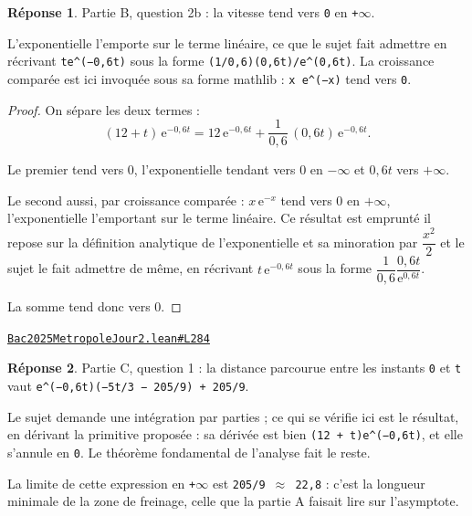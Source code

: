 \documentclass[11pt,a4paper]{article}
\theoremstyle{definition}
\theoremstyle{plain}
\theoremstyle{definition}
\newtheorem*{reponse}{Réponse}
\newcommand{\source}[2]{\par\smallskip\noindent\hfill{\footnotesize\href{#1}{\texttt{#2}}}\par\smallskip}
\begin{document}
\begin{reponse}
Partie B, question 2b : la vitesse tend vers \texttt{0} en \texttt{+\(\infty\)}.

L'exponentielle l'emporte sur le terme linéaire, ce que le sujet fait admettre en
récrivant \texttt{te\textasciicircum{}(−0,6t)} sous la forme \texttt{(1/0,6)(0,6t)/e\textasciicircum{}(0,6t)}. La croissance comparée
est ici invoquée sous sa forme mathlib : \texttt{x e\textasciicircum{}(−x)} tend vers \texttt{0}.
\end{reponse}
\begin{proof}
On sépare les deux termes :
\[ (12 + t)\,\mathrm{e}^{-0{,}6t}
   = 12\,\mathrm{e}^{-0{,}6t} + \frac{1}{0{,}6}\,(0{,}6t)\,\mathrm{e}^{-0{,}6t} . \]

Le premier tend vers $0$, l'exponentielle tendant vers $0$ en $-\infty$ et $0{,}6t$ vers
$+\infty$.

Le second aussi, par croissance comparée : $x\,\mathrm{e}^{-x}$ tend vers $0$ en
$+\infty$, l'exponentielle l'emportant sur le terme linéaire. Ce résultat est emprunté
\textemdash{} il repose sur la définition analytique de l'exponentielle et sa minoration
par $\dfrac{x^2}{2}$ \textemdash{} et le sujet le fait admettre de même, en récrivant
$t\,\mathrm{e}^{-0{,}6t}$ sous la forme $\dfrac{1}{0{,}6} \dfrac{0{,}6t}{\mathrm{e}^{0{,}6t}}$.

La somme tend donc vers $0$.
\end{proof}
\source{https://github.com/Commutator-IO/learn-lean/blob/main/exams/2025/Bac2025MetropoleJour2.lean\#L284}{Bac2025MetropoleJour2.lean\#L284}

\begin{reponse}
Partie C, question 1 : la distance parcourue entre les instants \texttt{0} et \texttt{t} vaut
\texttt{e\textasciicircum{}(−0,6t)(−5t/3 − 205/9) + 205/9}.

Le sujet demande une intégration par parties ; ce qui se vérifie ici est le résultat,
en dérivant la primitive proposée : sa dérivée est bien \texttt{(12 + t)e\textasciicircum{}(−0,6t)}, et elle
s'annule en \texttt{0}. Le théorème fondamental de l'analyse fait le reste.

La limite de cette expression en \texttt{+\(\infty\)} est \texttt{205/9 \(\approx\) 22,8} : c'est la longueur minimale
de la zone de freinage, celle que la partie A faisait lire sur l'asymptote.
\end{reponse}
\end{document}
